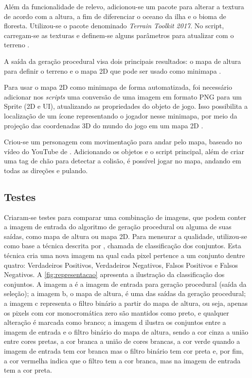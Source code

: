 Além da funcionalidade de relevo, adicionou-se um pacote para alterar a textura de acordo com a altura, a fim de diferenciar o oceano da ilha e o bioma de floresta. Utilizou-se o pacote denominado \textit{Terrain Toolkit 2017}. No script, carregam-se as texturas e definem-se alguns parâmetros para atualizar com o terreno \cite{unity-terrain-toolkit}.

A saída da geração procedural visa dois principais resultados: o mapa de altura para definir o terreno e o mapa 2D que pode ser usado como minimapa \cite{unitywebpage}.

Para usar o mapa 2D como minimapa de forma automatizada, foi necessário adicionar nos \textit{scripts} uma conversão de uma imagem em formato PNG para um Sprite (2D e UI), atualizando as propriedades do objeto de jogo. Isso possibilita a localização de um ícone representando o jogador nesse minimapa, por meio da projeção das coordenadas 3D do mundo do jogo em um mapa 2D \cite{unitywebpage}.


Criou-se um personagem com movimentação para andar pelo mapa, baseado no vídeo do YouTube de . Adicionando os objetos e o script principal, além de criar uma tag de chão para detectar a colisão, é possível jogar no mapa, andando em todas as direções e pulando.

\subsection{Testes}

Criaram-se testes para comparar uma combinação de imagens, que podem conter a imagem de entrada do algoritmo de geração procedural ou alguma de suas saídas, como mapa de altura ou mapa 2D. Para mensurar a qualidade, utilizou-se como base a técnica descrita por , chamada de classificação dos conjuntos. Esta técnica cria uma nova imagem na qual cada pixel pertence a um conjunto dentre quatro: Verdadeiros Positivos, Verdadeiros Negativos, Falsos Positivos e Falsos Negativos. A \cref{fig:representacao} apresenta a ilustração da classificação dos conjuntos. A imagem a é a imagem de entrada para geração procedural (saída da seleção); a imagem b, o mapa de altura, é uma das saídas da geração procedural; a imagem c representa o filtro binário a partir do mapa de altura, ou seja, apenas os pixels com cor monocromática zero são mantidos como preto, e qualquer alteração é marcada como branco; a imagem d ilustra os conjuntos entre a imagem de entrada e o filtro binário do mapa de altura, sendo a cor cinza a união entre cores pretas, a cor branca a união de cores brancas, a cor verde quando a imagem de entrada tem cor branca mas o filtro binário tem cor preta e, por fim, a cor vermelha indica que o filtro tem a cor branca, mas na imagem de entrada tem a cor preta.

